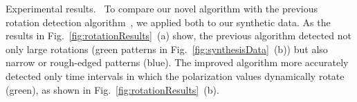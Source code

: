 \textsf{Experimental results.\ } To compare our novel algorithm with the previous rotation detection algorithm~\cite{Sawada2018}, we applied both to our synthetic data.
As the results in Fig.~\ref{fig:rotationResults}~(a) show, 
the previous algorithm detected not only large rotations (green patterns in Fig.~\ref{fig:synthesisData}~(b)) but also narrow or rough-edged patterns (blue).
The improved algorithm more accurately detected only time intervals in which the polarization values dynamically rotate (green), as shown in Fig.~\ref{fig:rotationResults}~(b).







